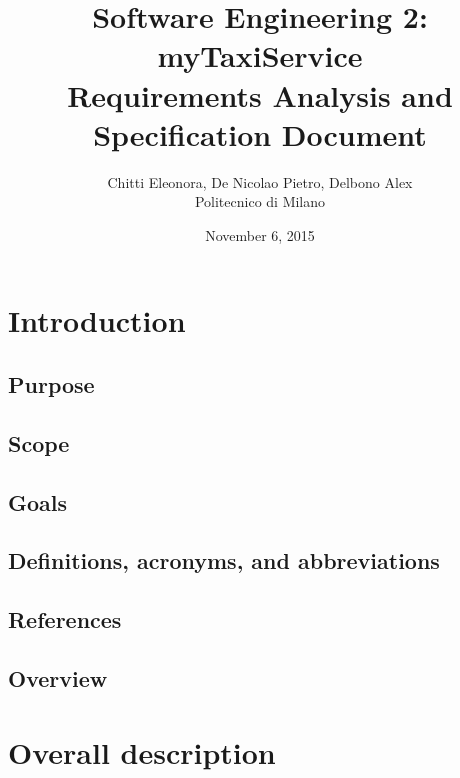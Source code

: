 \documentclass[12pt, a4paper]{report}
\begin{document}
\title{Software Engineering 2: myTaxiService \\ \vspace{1em} Requirements Analysis and Specification Document}
\author{Chitti Eleonora, De Nicolao Pietro, Delbono Alex\\
Politecnico di Milano}
\date{November 6, 2015}
\maketitle
\tableofcontents

\chapter{Introduction}
\label{ch:introduction}

\section{Purpose}


\section{Scope}


\section{Goals}


\section{Definitions, acronyms, and abbreviations}


\section{References}


\section{Overview}


\chapter{Overall description}
\label{ch:overall-desc}
\end{document}
